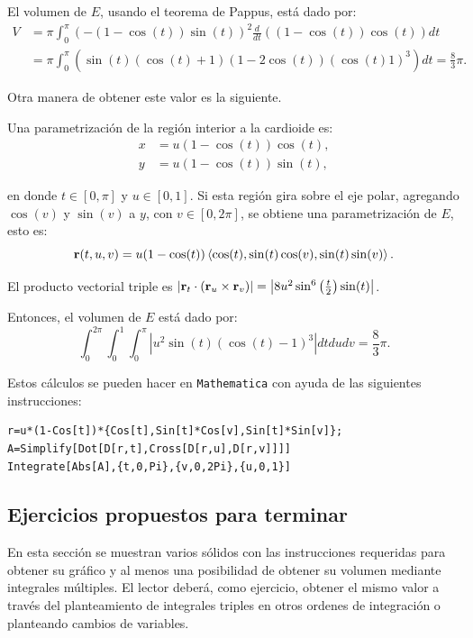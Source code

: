 El volumen de $E$, usando el teorema de Pappus, está dado por:
\begin{align*}
V&=\pi \int_{0}^{\pi }\left(- \left( 1-\cos (t) \right) \sin
(t) \right) ^{2}\frac{d}{dt}\left( \left( 1-\cos (t)
\right) \cos (t) \right) dt \\
&= \pi \int_{0}^{\pi }\left( \sin (t) \left( \cos (t)
+1\right) \left( 1-2\cos (t) \right) \left( \cos (t)
1\right) ^{3} \right) dt = \frac{8}{3}\pi.
\end{align*}

Otra manera de obtener este valor es la siguiente.

Una parametrización de la región interior a la cardioide es:
\begin{align*}
x&=u\left( 1-\cos (t) \right) \cos (t),\\
y&=u\left( 1-\cos (t) \right) \sin (t),
\end{align*}

\clearpage

en donde $t\in [0,\pi]$ y $u\in [0,1]$. Si esta región gira sobre el eje polar, agregando $\cos(v)$ y $\sin(v)$ a $y$, con $v \in [0,2\pi]$, se obtiene una parametrización de $E$, esto es:
\[{\bf r}(t,u,v)=u(1-\cos (t))\left\langle \cos (t) ,\sin (t) \cos (v) ,\sin(t) \sin (v) \right \rangle.\]

El producto vectorial triple es $\left| {\bf r}_{t}\cdot \left( {\bf r}_{u}\times {\bf r}_{v}\right) \right| = \left| 8 u^2 \sin ^6\left(\frac{t}{2}\right) \sin (t)\right| $.

Entonces, el volumen de $E$ está dado por:
\[\int_{0}^{2\pi }\int_{0}^{1}\int_{0}^{\pi }\left| u^{2}\sin (t)
\left( \cos (t) -1\right) ^{3}\right| dtdudv= \frac{8}{3}\pi.\]

Estos cálculos se pueden hacer en \verb"Mathematica" con ayuda de las siguientes instrucciones:

\begin{tcolorbox}[title=\bf Instrucción \verb"Mathematica"]
\begin{Verbatim}[formatcom=\letraverbatim]
r=u*(1-Cos[t])*{Cos[t],Sin[t]*Cos[v],Sin[t]*Sin[v]};
A=Simplify[Dot[D[r,t],Cross[D[r,u],D[r,v]]]]
Integrate[Abs[A],{t,0,Pi},{v,0,2Pi},{u,0,1}]
\end{Verbatim}
\end{tcolorbox}


\subsection{Ejercicios propuestos para terminar}
En esta sección se muestran varios sólidos con las instrucciones requeridas para obtener su gráfico y
al menos una posibilidad de obtener su volumen mediante integrales múltiples.
El lector deberá, como ejercicio, obtener el mismo valor a través del planteamiento de integrales triples en otros
ordenes de integración o planteando cambios de variables.

